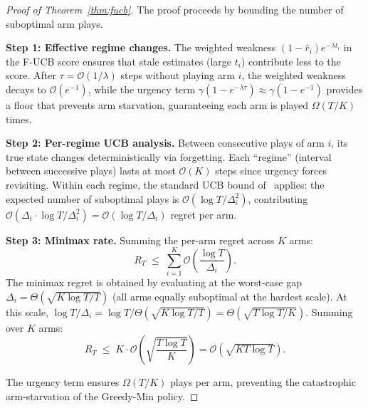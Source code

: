\begin{proof}[Proof of Theorem~\ref{thm:fucb}]
The proof proceeds by bounding the number of suboptimal arm plays.

\textbf{Step 1: Effective regime changes.}
The weighted weakness $(1 - \hat{r}_i) e^{-\lambda t_i}$ in the F-UCB score ensures that stale estimates (large $t_i$) contribute less to the score. After $\tau = \mathcal{O}(1/\lambda)$ steps without playing arm $i$, the weighted weakness decays to $\mathcal{O}(e^{-1})$, while the urgency term $\gamma(1 - e^{-\lambda \tau}) \approx \gamma(1 - e^{-1})$ provides a floor that prevents arm starvation, guaranteeing each arm is played $\Omega(T/K)$ times.

\textbf{Step 2: Per-regime UCB analysis.}
Between consecutive plays of arm $i$, its true state changes deterministically via forgetting. Each ``regime'' (interval between successive plays) lasts at most $\mathcal{O}(K)$ steps since urgency forces revisiting. Within each regime, the standard UCB bound of~\citet{auer2002finite} applies: the expected number of suboptimal plays is $\mathcal{O}(\log T / \Delta_i^2)$, contributing $\mathcal{O}(\Delta_i \cdot \log T / \Delta_i^2) = \mathcal{O}(\log T / \Delta_i)$ regret per arm.

\textbf{Step 3: Minimax rate.}
Summing the per-arm regret across $K$ arms:
\[
R_T \;\leq\; \sum_{i=1}^{K} \mathcal{O}\!\left(\frac{\log T}{\Delta_i}\right).
\]
The minimax regret is obtained by evaluating at the worst-case gap $\Delta_i = \Theta(\sqrt{K\log T / T})$ (all arms equally suboptimal at the hardest scale).
At this scale, $\log T / \Delta_i = \log T / \Theta(\sqrt{K\log T/T}) = \Theta(\sqrt{T\log T / K})$.
Summing over $K$ arms:
\[
R_T \;\leq\; K \cdot \mathcal{O}\!\left(\sqrt{\frac{T\log T}{K}}\right) = \mathcal{O}\!\left(\sqrt{KT\log T}\right).
\]

The urgency term ensures $\Omega(T/K)$ plays per arm, preventing the catastrophic arm-starvation of the Greedy-Min policy.
\end{proof}

